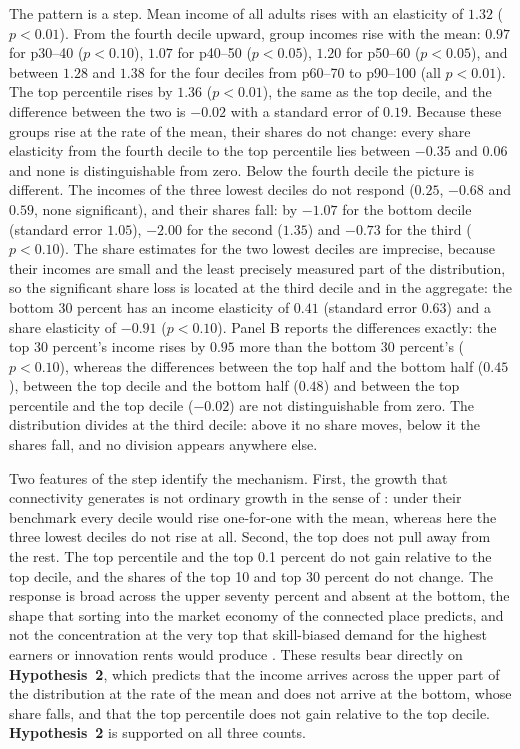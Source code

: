 The pattern is a step. Mean income of all adults rises with an elasticity of $1.32$ ($p<0.01$). From the fourth decile upward, group incomes rise with the mean: $0.97$ for p30--40 ($p<0.10$), $1.07$ for p40--50 ($p<0.05$), $1.20$ for p50--60 ($p<0.05$), and between $1.28$ and $1.38$ for the four deciles from p60--70 to p90--100 (all $p<0.01$). The top percentile rises by $1.36$ ($p<0.01$), the same as the top decile, and the difference between the two is $-0.02$ with a standard error of $0.19$. Because these groups rise at the rate of the mean, their shares do not change: every share elasticity from the fourth decile to the top percentile lies between $-0.35$ and $0.06$ and none is distinguishable from zero. Below the fourth decile the picture is different. The incomes of the three lowest deciles do not respond ($0.25$, $-0.68$ and $0.59$, none significant), and their shares fall: by $-1.07$ for the bottom decile (standard error $1.05$), $-2.00$ for the second ($1.35$) and $-0.73$ for the third ($p<0.10$). The share estimates for the two lowest deciles are imprecise, because their incomes are small and the least precisely measured part of the distribution, so the significant share loss is located at the third decile and in the aggregate: the bottom 30 percent has an income elasticity of $0.41$ (standard error $0.63$) and a share elasticity of $-0.91$ ($p<0.10$). Panel B reports the differences exactly: the top 30 percent's income rises by $0.95$ more than the bottom 30 percent's ($p<0.10$), whereas the differences between the top half and the bottom half ($0.45$), between the top decile and the bottom half ($0.48$) and between the top percentile and the top decile ($-0.02$) are not distinguishable from zero. The distribution divides at the third decile: above it no share moves, below it the shares fall, and no division appears anywhere else.

Two features of the step identify the mechanism. First, the growth that connectivity generates is not ordinary growth in the sense of \citet{Dollar_2016}: under their benchmark every decile would rise one-for-one with the mean, whereas here the three lowest deciles do not rise at all. Second, the top does not pull away from the rest. The top percentile and the top 0.1 percent do not gain relative to the top decile, and the shares of the top 10 and top 30 percent do not change. The response is broad across the upper seventy percent and absent at the bottom, the shape that sorting into the market economy of the connected place predicts, and not the concentration at the very top that skill-biased demand for the highest earners or innovation rents would produce \citep{Aghion_2018}. These results bear directly on \textbf{Hypothesis~2}, which predicts that the income arrives across the upper part of the distribution at the rate of the mean and does not arrive at the bottom, whose share falls, and that the top percentile does not gain relative to the top decile. \textbf{Hypothesis~2} is supported on all three counts.


